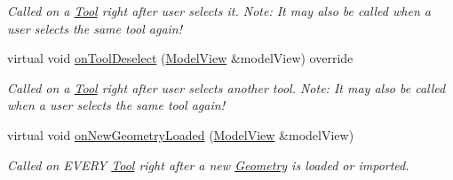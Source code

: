 \begin{DoxyCompactItemize}
\begin{DoxyCompactList}\small\item\em Called on a \mbox{\hyperlink{classpepr3d_1_1_tool}{Tool}} right after user selects it. Note\+: It may also be called when a user selects the same tool again! \end{DoxyCompactList}\item 
\mbox{\label{classpepr3d_1_1_brush_a6c6e2fb6715017a34ac7269b871cbf6d}} 
virtual void \mbox{\hyperlink{classpepr3d_1_1_brush_a6c6e2fb6715017a34ac7269b871cbf6d}{on\+Tool\+Deselect}} (\mbox{\hyperlink{classpepr3d_1_1_model_view}{Model\+View}} \&model\+View) override
\begin{DoxyCompactList}\small\item\em Called on a \mbox{\hyperlink{classpepr3d_1_1_tool}{Tool}} right after user selects another tool. Note\+: It may also be called when a user selects the same tool again! \end{DoxyCompactList}\item 
\mbox{\label{classpepr3d_1_1_brush_a73a878df80b0e06bccd02015e170f770}} 
virtual void \mbox{\hyperlink{classpepr3d_1_1_brush_a73a878df80b0e06bccd02015e170f770}{on\+New\+Geometry\+Loaded}} (\mbox{\hyperlink{classpepr3d_1_1_model_view}{Model\+View}} \&model\+View)
\begin{DoxyCompactList}\small\item\em Called on E\+V\+E\+RY \mbox{\hyperlink{classpepr3d_1_1_tool}{Tool}} right after a new \mbox{\hyperlink{classpepr3d_1_1_geometry}{Geometry}} is loaded or imported. \end{DoxyCompactList}\end{DoxyCompactItemize}
